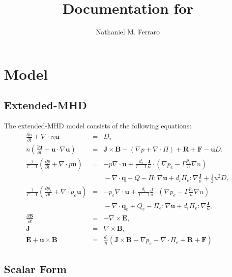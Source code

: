 \documentclass[draft]{book}
\title{Documentation for \codename}
\author{Nathaniel M. Ferraro}
\newcommand{\ddt}[1]{\frac{\partial #1}{\partial t}}
\renewcommand{\vec}[1]{\ensuremath{\mathbf{#1}}}
\newcommand{\tensor}[1]{\mathsf{#1}}
\newcommand{\B}{\vec{B}}
\newcommand{\E}{\vec{E}}
\newcommand{\R}{\vec{R}}
\renewcommand{\u}{\vec{u}}
\newcommand{\F}{\vec{F}}
\renewcommand{\j}{\vec{J}}
\newcommand{\q}{\vec{q}}
\newcommand{\jn}{\frac{\j}{n}}
\renewcommand{\P}{\tensor{\Pi}}
\renewcommand{\div}[1]{\nabla \cdot #1}
\newcommand{\curl}[1]{\nabla \times #1}
\begin{document}
\maketitle

\setcounter{tocdepth}{3}
\tableofcontents

\chapter{Model}

\section{Extended-MHD}

The extended-MHD model consists of the following equations:
\begin{subequations} \label{eq:xmhd}
\begin{eqnarray}
  \label{eq:continuity}
  \ddt{n} + \div n \u & = & D,
  \\
  \label{eq:momentum}
  n \left( \ddt{\u} + \u \cdot \nabla \u \right) 
  & = & \j \times \B - (\nabla p + \div \P) + \R + \F - \u D,
  \\
  \frac{1}{\Gamma-1} \left( \ddt{p} + \div{p\u} \right)
  & = & -p \div\u +
  \frac{d_i}{\Gamma-1}\jn\cdot\left(\nabla p_e -
  \Gamma \frac{p_e}{n}\nabla n \right)
  \\ & & \mbox{}
  - \div{\q} + Q - \P:\nabla \u + d_i \P_e:\nabla \jn + \frac{1}{2} u^2 D,
  \nonumber \\
  \frac{1}{\Gamma-1} \left( \ddt{p_e} + \div{p_e\u} \right)
  & = & -p_e \div\u +
  \frac{d_i}{\Gamma-1}\jn\cdot\left(\nabla p_e -
  \Gamma \frac{p_e}{n}\nabla n \right)
  \\ & & \mbox{} 
  - \div{\q_e} + Q_e - \P_e:\nabla \u + d_i \P_e:\nabla \jn,
  \nonumber 
  \\
  \label{eq:Faraday}
  \ddt{\B} & = & -\curl \E,
  \\
  \j & = &\curl \B,
  \\
  \label{eq:ohm}
  \E + \u \times \B & = &  
  \frac{d_i}{n} \left(\j\times\B - \nabla p_e 
  - \div{\P_e} + \R + \F \right)
\end{eqnarray}
\end{subequations}


\section{Scalar Form}
\end{document}

